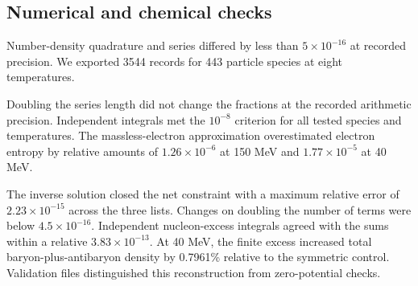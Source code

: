 \subsection{Numerical and chemical checks}
Number-density quadrature and series differed by less than $5\times10^{-16}$ at recorded precision. We exported 3544 records for 443 particle species at eight temperatures.

Doubling the series length did not change the fractions at the recorded arithmetic precision. Independent integrals met the $10^{-8}$ criterion for all tested species and temperatures. The massless-electron approximation overestimated electron entropy by relative amounts of $1.26\times10^{-6}$ at 150 MeV and $1.77\times10^{-5}$ at 40 MeV.

The inverse solution closed the net constraint with a maximum relative error of $2.23\times10^{-15}$ across the three lists. Changes on doubling the number of terms were below $4.5\times10^{-16}$. Independent nucleon-excess integrals agreed with the sums within a relative $3.83\times10^{-13}$. At 40 MeV, the finite excess increased total baryon-plus-antibaryon density by 0.7961\% relative to the symmetric control. Validation files distinguished this reconstruction from zero-potential checks.
